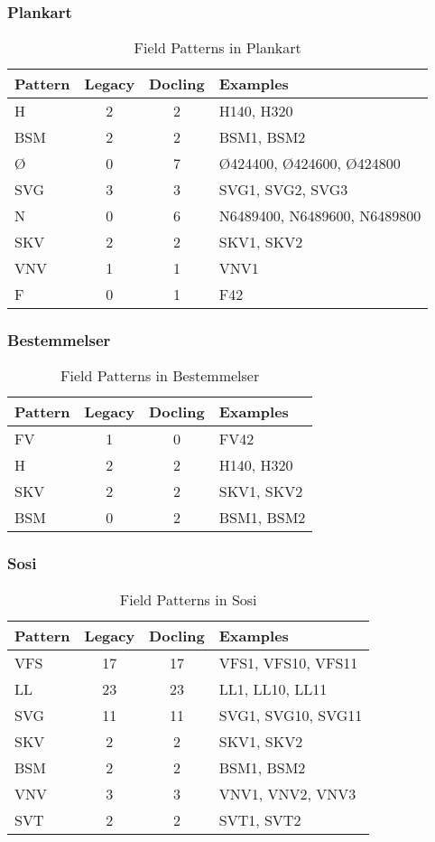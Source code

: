 \subsubsection{Plankart}

\begin{table}[h]
\centering
\begin{tabular}{l|cc|l}
\hline
Pattern & Legacy & Docling & Examples \\
\hline
H & 2 & 2 & H140, H320 \\
BSM & 2 & 2 & BSM1, BSM2 \\
Ø & 0 & 7 & Ø424400, Ø424600, Ø424800 \\
SVG & 3 & 3 & SVG1, SVG2, SVG3 \\
N & 0 & 6 & N6489400, N6489600, N6489800 \\
SKV & 2 & 2 & SKV1, SKV2 \\
VNV & 1 & 1 & VNV1 \\
F & 0 & 1 & F42 \\
\hline
\end{tabular}
\caption{Field Patterns in Plankart}
\end{table}

\subsubsection{Bestemmelser}

\begin{table}[h]
\centering
\begin{tabular}{l|cc|l}
\hline
Pattern & Legacy & Docling & Examples \\
\hline
FV & 1 & 0 & FV42 \\
H & 2 & 2 & H140, H320 \\
SKV & 2 & 2 & SKV1, SKV2 \\
BSM & 0 & 2 & BSM1, BSM2 \\
\hline
\end{tabular}
\caption{Field Patterns in Bestemmelser}
\end{table}

\subsubsection{Sosi}

\begin{table}[h]
\centering
\begin{tabular}{l|cc|l}
\hline
Pattern & Legacy & Docling & Examples \\
\hline
VFS & 17 & 17 & VFS1, VFS10, VFS11 \\
LL & 23 & 23 & LL1, LL10, LL11 \\
SVG & 11 & 11 & SVG1, SVG10, SVG11 \\
SKV & 2 & 2 & SKV1, SKV2 \\
BSM & 2 & 2 & BSM1, BSM2 \\
VNV & 3 & 3 & VNV1, VNV2, VNV3 \\
SVT & 2 & 2 & SVT1, SVT2 \\
\hline
\end{tabular}
\caption{Field Patterns in Sosi}
\end{table}

